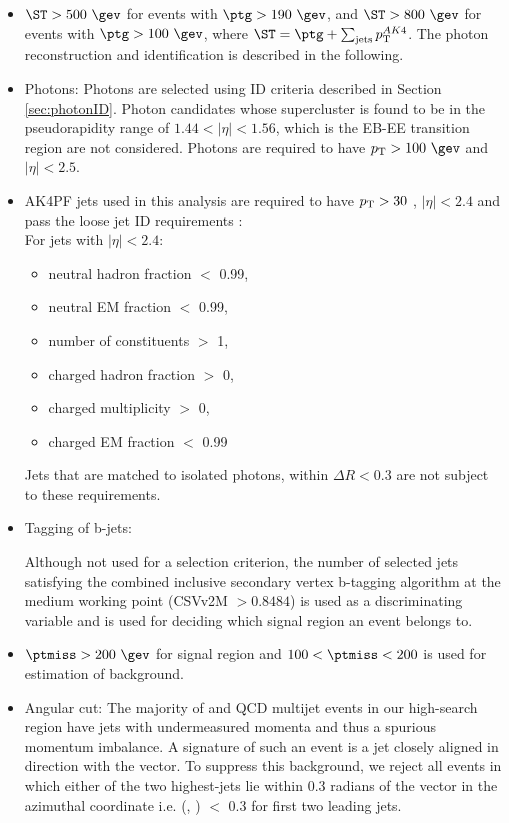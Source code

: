 \begin{itemize}
\item  $\ST>500\ \gev$ for events with $\ptg>190~\gev$,
 and $\ST>800~\gev$ for events with $\ptg>100~\gev$, where $\ST = \ptg+\sum_{\mathrm{jets}} \pt^{AK4}$.
The photon reconstruction and identification is described in the following.

\item Photons: 
Photons are selected using ID criteria described in Section \ref{sec:photonID}.
Photon candidates whose supercluster
is found to be in the pseudorapidity range of $1.44 < |\eta| < 1.56$, which is the EB-EE 
transition region are not considered.
Photons are required to have $\pt>100~\gev$
and $|\eta|<2.5$.

\item AK4PF jets used in this analysis are required to have $p_{\mathrm{T}}>30$ \gev, $|\eta|<2.4$ and pass the loose jet ID requirements \cite{CMS-PAS-JME-16-003}: \\
  For jets with $|\eta|<2.4$:
  \begin{itemize}
  \item neutral hadron fraction $<$ 0.99,
  \item neutral EM fraction $<$ 0.99,
  \item number of constituents $>$ 1,
  \item charged hadron fraction $>$ 0,
  \item charged multiplicity $>$ 0,
  \item charged EM fraction $<$ 0.99
  \end{itemize}
  Jets that are matched to isolated photons, within $\Delta R<0.3$ are not subject to these requirements.   

\item Tagging of b-jets:

  Although not used for a selection criterion, the number of selected
  jets satisfying the combined inclusive secondary vertex b-tagging algorithm at the medium working
  point (CSVv2M $>0.8484$) is used as a discriminating variable \cite{BTV-16-002} and is used for deciding which signal region an event 
  belongs to.

\item $\ptmiss>200\ \gev$ for signal region and $100 < \ptmiss < 200$ \gev is used for estimation of \gjets background.
\item Angular cut:
  The majority of \gjets and QCD multijet events in our high-\ptmiss search region
  have jets with undermeasured momenta and thus a spurious
  momentum imbalance.  A signature of such an event is a jet closely
  aligned in direction with the \ptmiss vector.  To suppress this background, we reject
  all events in which either of the two highest-\pt jets lie within 0.3 radians
  of the \ptmiss vector in the azimuthal coordinate i.e. \dphi(\ptvecmiss, \ptvecjet) $<$ 0.3 for first two leading jets.


\end{itemize}
